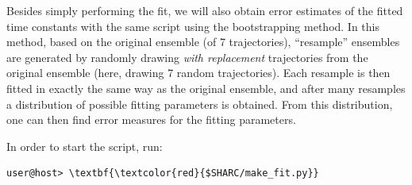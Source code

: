 \documentclass[a4paper,11pt,DIV=15,openany]{scrbook}
\begin{document}
Besides simply performing the fit, we will also obtain error estimates of the fitted time constants with the same script using the bootstrapping method.
In this method, based on the original ensemble (of 7 trajectories), ``resample'' ensembles are generated by randomly drawing \emph{with replacement} trajectories from the original ensemble (here, drawing 7 random trajectories).
Each resample is then fitted in exactly the same way as the original ensemble, and after many resamples a distribution of possible fitting parameters is obtained.
From this distribution, one can then find error measures for the fitting parameters.

In order to start the script, run:
\begin{Verbatim}[commandchars=\\\{\}]
user@host> \textbf{\textcolor{red}{$SHARC/make_fit.py}}
\end{Verbatim}
\end{document}

